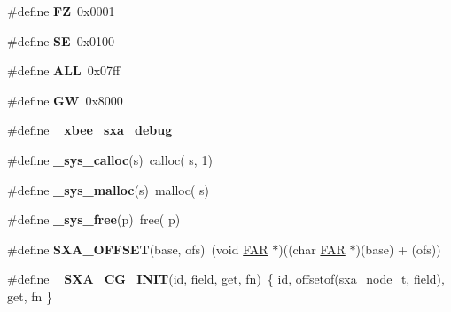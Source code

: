 \begin{DoxyCompactItemize}
\item 
\hypertarget{group___s_x_a_gab288c4e26b9e229231ba0f0f6b039b62}{\#define {\bfseries F\-Z}~0x0001}\label{group___s_x_a_gab288c4e26b9e229231ba0f0f6b039b62}

\item 
\hypertarget{group___s_x_a_ga18bbe716f5be6adbd2150139244c0262}{\#define {\bfseries S\-E}~0x0100}\label{group___s_x_a_ga18bbe716f5be6adbd2150139244c0262}

\item 
\hypertarget{group___s_x_a_ga1edd1ea8bddaf4d9c5eb3eae1ee1726a}{\#define {\bfseries A\-L\-L}~0x07ff}\label{group___s_x_a_ga1edd1ea8bddaf4d9c5eb3eae1ee1726a}

\item 
\hypertarget{group___s_x_a_gaac44b4153048abba18e0e606de4e42bc}{\#define {\bfseries G\-W}~0x8000}\label{group___s_x_a_gaac44b4153048abba18e0e606de4e42bc}

\item 
\hypertarget{group___s_x_a_gade008fe82b5455e08af1525adb4fd2ae}{\#define {\bfseries \-\_\-xbee\-\_\-sxa\-\_\-debug}}\label{group___s_x_a_gade008fe82b5455e08af1525adb4fd2ae}

\item 
\hypertarget{group___s_x_a_ga5d892efb368534a238af99c167fcf490}{\#define {\bfseries \-\_\-sys\-\_\-calloc}(s)~calloc( s, 1)}\label{group___s_x_a_ga5d892efb368534a238af99c167fcf490}

\item 
\hypertarget{group___s_x_a_ga90f66b432e3d4f1df7742dd79c3bffbc}{\#define {\bfseries \-\_\-sys\-\_\-malloc}(s)~malloc( s)}\label{group___s_x_a_ga90f66b432e3d4f1df7742dd79c3bffbc}

\item 
\hypertarget{group___s_x_a_ga61f8debfdf54fdac92d3ad1754e8afe5}{\#define {\bfseries \-\_\-sys\-\_\-free}(p)~free( p)}\label{group___s_x_a_ga61f8debfdf54fdac92d3ad1754e8afe5}

\item 
\hypertarget{group___s_x_a_ga8f17956f64da8e8d2302ce13991f41b9}{\#define {\bfseries S\-X\-A\-\_\-\-O\-F\-F\-S\-E\-T}(base, ofs)~(void \hyperlink{group__hal_gaef060b3456fdcc093a7210a762d5f2ed}{F\-A\-R} $\ast$)((char \hyperlink{group__hal_gaef060b3456fdcc093a7210a762d5f2ed}{F\-A\-R} $\ast$)(base) + (ofs))}\label{group___s_x_a_ga8f17956f64da8e8d2302ce13991f41b9}

\item 
\hypertarget{group___s_x_a_gab234f96bee6d9d1493d29872a2d48110}{\#define {\bfseries \-\_\-\-S\-X\-A\-\_\-\-C\-G\-\_\-\-I\-N\-I\-T}(id, field, get, fn)~\{ id, offsetof(\hyperlink{structsxa__node__t}{sxa\-\_\-node\-\_\-t}, field), get, fn \}}\label{group___s_x_a_gab234f96bee6d9d1493d29872a2d48110}


\end{DoxyCompactItemize}
